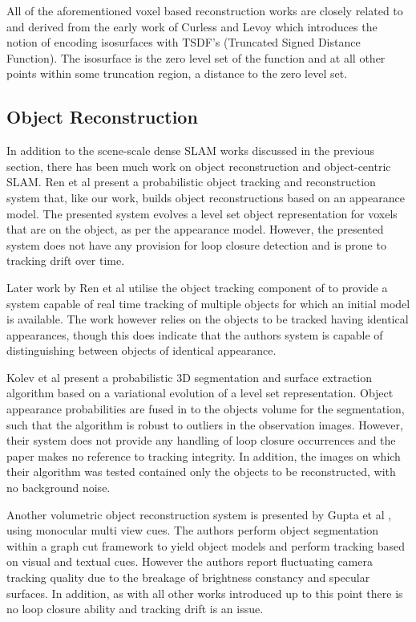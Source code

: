All of the aforementioned voxel based reconstruction works are closely related to and derived from the early work of Curless and Levoy \cite{Curless1996} 
which introduces the notion of encoding isosurfaces with TSDF's (Truncated Signed Distance Function). The isosurface is the zero level set of the function 
and at all other points within some truncation region, a distance to the zero level set.

\subsection{Object Reconstruction}
In addition to the scene-scale dense SLAM works discussed in the previous section, there has been much work on object reconstruction and 
object-centric SLAM. Ren et al \cite{Ren2013} present a probabilistic object tracking and reconstruction system that, like our work, builds 
object reconstructions based on an appearance model. The presented system evolves a level set object representation for voxels that 
are on the object, as per the appearance model. However, the presented system does not have any provision for loop closure detection and 
is prone to tracking drift over time.

Later work by Ren et al \cite{Ren2014} utilise the object tracking component of \cite{Ren2013} to provide a system capable of real time tracking 
of multiple objects for which an initial model is available. The work however relies on the objects to be tracked having identical appearances, 
though this does indicate that the authors system is capable of distinguishing between objects of identical appearance.

Kolev et al present a probabilistic 3D segmentation and surface extraction algorithm \cite{Kolev2006} based on a variational evolution of a level 
set representation. Object appearance probabilities are fused in to the objects volume for the segmentation, such that the algorithm is robust to 
outliers in the observation images. However, their system does not provide any handling of 
loop closure occurrences and the paper makes no reference to tracking integrity. In addition, the images on which their algorithm was tested 
contained only the objects to be reconstructed, with no background noise.

Another volumetric object reconstruction system is presented by Gupta et al \cite{Gupta2016}, using monocular multi view cues. The authors 
perform object segmentation within a graph cut framework to yield object models and perform tracking based on visual and textual cues. 
However the authors report fluctuating camera tracking quality due to the breakage of brightness constancy and specular surfaces. In addition, 
as with all other works introduced up to this point there is no loop closure ability and tracking drift is an issue.

